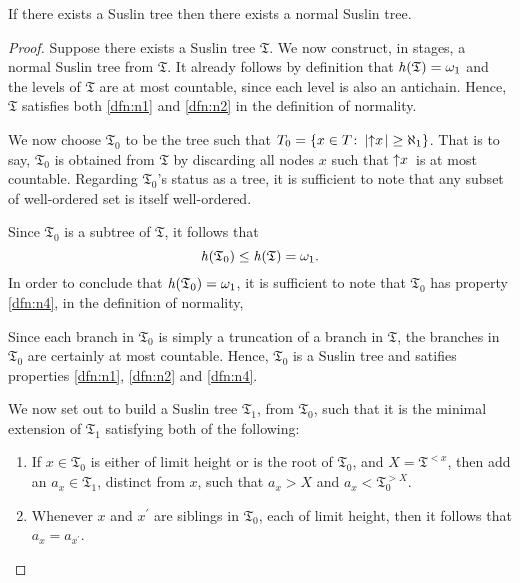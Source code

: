 \begin{lem}\label{lem:norm}
	If there exists a Suslin tree then there exists a normal Suslin tree.
\end{lem}
\begin{proof}
	Suppose there exists a Suslin tree $\mathfrak{T}$.  We now construct, in
    stages, a normal Suslin tree from $\mathfrak{T}$.  It already follows by
    definition that $\mathit{h}(\mathfrak{T})=\omega_1$ and the levels of
    $\mathfrak{T}$ are at most countable, since each level is also an antichain.
    Hence, $\mathfrak{T}$ satisfies both \ref{dfn:n1} and \ref{dfn:n2} in the
    definition of normality.

	We now choose $\mathfrak{T}_0$ to be the tree such that
	$T_0=\left\lbrace x\in T\colon \left\lvert\left\uparrow x\right.\right\rvert\geq\aleph_1 \right\rbrace$.  That is to say,
	$\mathfrak{T}_0$ is obtained from $\mathfrak{T}$ by discarding all nodes $x$
	such that $\left\uparrow x\right.$ is at most countable.  Regarding $\mathfrak{T}_{0}$'s
	status as a tree, it is sufficient to note that any subset of well-ordered
	set is itself well-ordered.

	Since $\mathfrak{T}_{0}$ is a subtree of $\mathfrak{T}$, it follows that
	\begin{equation}
		\mathit{h}(\mathfrak{T}_{0})\leq\mathit{h}(\mathfrak{T})=\omega_{1}.
	\end{equation}
     In order to conclude that $\mathit{h}(\mathfrak{T}_0)=\omega_1$, it is
     sufficient to note that $\mathfrak{T}_0$ has property \ref{dfn:n4}, in the
     definition of normality, 
    

	Since each branch in $\mathfrak{T}_{0}$ is simply a truncation of a branch
	in $\mathfrak{T}$, the branches in $\mathfrak{T}_{0}$ are certainly at most
    countable.  Hence, $\mathfrak{T}_0$ is a Suslin tree and satifies properties
    \ref{dfn:n1}, \ref{dfn:n2} and \ref{dfn:n4}.

    We now set out to build a Suslin tree $\mathfrak{T}_1$, from
    $\mathfrak{T}_0$, such that it is the minimal extension of
    $\mathfrak{T}_{1}$ satisfying both of the following:
	\begin{enumerate}
        \item If $x\in\mathfrak{T}_{0}$ is either of limit height or is the root
            of $\mathfrak{T}_{0}$, and $X=\mathfrak{T}^{<x}$, then add an
            $a_{x}\in\mathfrak{T}_{1}$, distinct from $x$, such that $a_{x}>X$
            and $a_{x}<\mathfrak{T}_{0}^{>X}$.
		\item Whenever $x$ and $x^{\prime}$ are siblings in $\mathfrak{T}_{0}$,
		      each of limit height, then it follows that $a_{x}=a_{x^{\prime}}$.
	\end{enumerate}


\end{proof}

